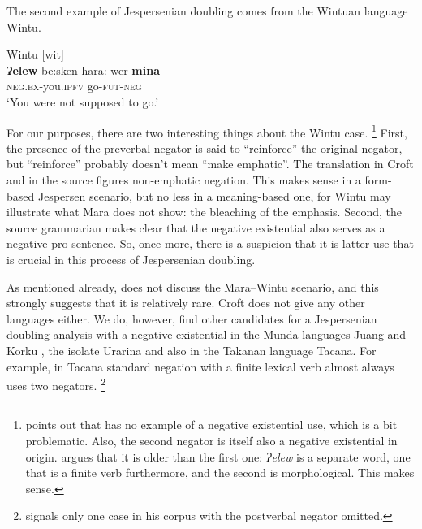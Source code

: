 ﻿\documentclass[output=paper,draft,draftmode,colorlinks,citecolor=brown]{langscibook}
\begin{document}
The second example of Jespersenian doubling comes from the Wintuan language Wintu.
%
\begin{exe}\ex\label{ex:int-wintu-go}
Wintu [wit] \\
    \gll \textbf{Ɂelew}-be:sken  hara:-wer-\textbf{mina} \\
\textsc{neg.ex}-you.\textsc{ipfv}  go-\textsc{fut}-\textsc{neg} \\
    \glt `You were not supposed to go.'
    \end{exe}
%
For our purposes, there are two interesting things about the Wintu
case.%
%
\footnote{\textcite[10]{Croft1991} points out that
\textcite{Pitkin1984}
has no example of a negative existential use, which is a bit problematic.
Also,  the second negator is itself also a negative existential in origin.
\textcite[10]{Croft1991} argues that it is older than the first one:
\textit{Ɂelew} is a separate word, one that is a finite verb furthermore,
and the second is morphological. This makes sense.}  %
%
First, the presence of the preverbal negator is said to ``reinforce''
\parencite[10]{Croft1991} the
original negator, but ``reinforce'' probably doesn't mean ``make emphatic''.
The translation in Croft and in the source figures non-emphatic negation.
This makes sense in a form-based Jespersen scenario, but no less in a
meaning-based one, for Wintu may illustrate what Mara does not show: the
bleaching of the emphasis. Second, the source grammarian
\textcite[197]{Pitkin1984} makes clear that the negative existential also
serves as a negative pro-sentence. So, once more, there is a suspicion that
it is latter use that is crucial in this process of Jespersenian doubling.

As mentioned already, \textcites{Veselinova2010}{Veselinova2013}{Veselinova2014}{Veselinova2015}{Veselinova2016} does not
discuss the Mara--Wintu scenario, and this strongly suggests that it is
relatively rare. Croft does not give any other languages either. We do,
however, find other candidates for a Jespersenian doubling analysis with a
negative existential in the Munda languages Juang
\parencite[150--151]{Anderson2007} and Korku \parencites[64--67]{Nagaraja1999}
[279--281]{Zide2008}, the isolate Urarina and also in the Takanan
language Tacana. For example, in Tacana standard negation with a finite
lexical verb almost always uses two negators.%
%
\footnote{ signals only one case in his corpus with the postverbal negator
omitted.}
\end{document}

